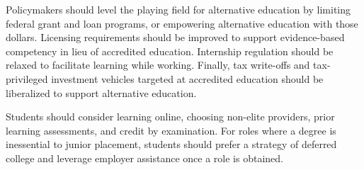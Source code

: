 \documentclass[AER]{./aea-latex-templates/AEA}
\begin{document}
        Policymakers should level the playing field for alternative education by limiting federal grant and loan programs,
        or empowering alternative education with those dollars.
        Licensing requirements should be improved to support evidence-based competency in lieu of accredited education.
        Internship regulation should be relaxed to facilitate learning while working.
        Finally, tax write-offs and tax-privileged investment vehicles targeted at accredited education should be liberalized
        to support alternative education.

        Students should consider learning online, choosing non-elite providers,
        prior learning assessments, and credit by examination.
        For roles where a degree is inessential to junior placement, students should prefer a strategy of
        deferred college and leverage employer assistance once a role is obtained.
        
        
        
        
        
\end{document}
